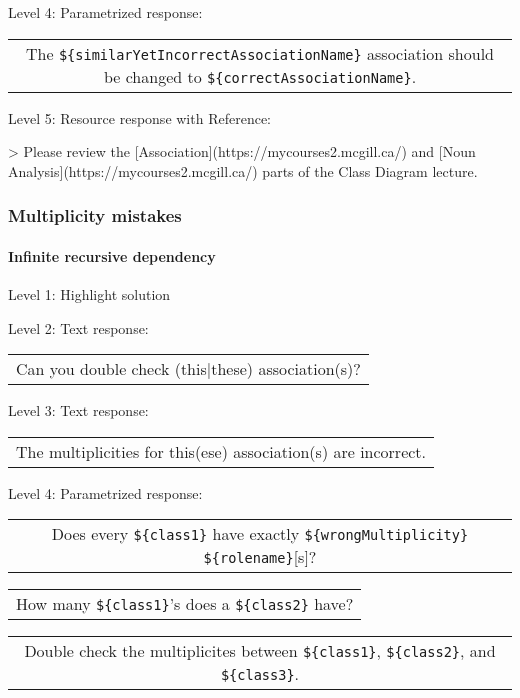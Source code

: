 \noindent Level 4: Parametrized response: \medskip

\begin{tabular}{|c}
The \verb|${similarYetIncorrectAssociationName}| association should be changed to \verb|${correctAssociationName}|.
\end{tabular} \medskip

\noindent Level 5: Resource response with Reference:

> Please review the [Association](https://mycourses2.mcgill.ca/) and [Noun Analysis](https://mycourses2.mcgill.ca/) parts of the Class Diagram lecture.


\subsubsection{Multiplicity mistakes}

\paragraph{Infinite recursive dependency}

\noindent Level 1: Highlight solution \medskip

\noindent Level 2: Text response: \medskip

\begin{tabular}{|c}
Can you double check (this|these) association(s)?
\end{tabular} \medskip

\noindent Level 3: Text response: \medskip

\begin{tabular}{|c}
The multiplicities for this(ese) association(s) are incorrect.
\end{tabular} \medskip

\noindent Level 4: Parametrized response: \medskip

\begin{tabular}{|c}
Does every \verb|${class1}| have exactly \verb|${wrongMultiplicity}| \verb|${rolename}|[s]?
\end{tabular} \medskip

\begin{tabular}{|c}
How many \verb|${class1}|'s does a \verb|${class2}| have?
\end{tabular} \medskip

\begin{tabular}{|c}
Double check the multiplicites between \verb|${class1}|, \verb|${class2}|, and \verb|${class3}|.
\end{tabular} \medskip

